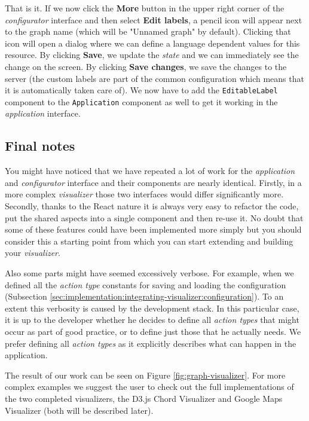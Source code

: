 That is it. If we now click the \textbf{More} button in the upper right corner of the \emph{configurator} interface and then select \textbf{Edit labels}, a pencil icon will appear next to the graph name (which will be "Unnamed graph" by default). Clicking that icon will open a dialog where we can define a language dependent values for this resource. By clicking \textbf{Save}, we update the \emph{state} and we can immediately see the change on the screen. By clicking \textbf{Save changes}, we save the changes to the server (the custom labels are part of the common configuration which means that it is automatically taken care of). We now have to add the \texttt{EditableLabel} component to the \texttt{Application} component as well to get it working in the \emph{application} interface.

\subsection{Final notes}
\label{sec:implementation:integrating-visualizer:final-notes}

You might have noticed that we have repeated a lot of work for the \emph{application} and \emph{configurator} interface and their components are nearly identical. Firstly, in a more complex \emph{visualizer} those two interfaces would differ significantly more. Secondly, thanks to the React nature it is always very easy to refactor the code, put the shared aspects into a single component and then re-use it. No doubt that some of these features could have been implemented more simply but you should consider this a starting point from which you can start extending and building your \emph{visualizer}.

Also some parts might have seemed excessively verbose. For example, when we defined all the \emph{action type} constants for saving and loading the configuration (Subsection \ref{sec:implementation:integrating-visualizer:configuration}). To an extent this verbosity is caused by the development stack. In this particular case, it is up to the developer whether he decides to define all \emph{action types} that might occur as part of good practice, or to define just those that he actually needs. We prefer defining all \emph{action types} as it explicitly describes what can happen in the application.

The result of our work can be seen on Figure \ref{fig:graph-visualizer}. For more complex examples we suggest the user to check out the full implementations of the two completed visualizers, the D3.js Chord Visualizer and Google Maps Visualizer (both will be described later).

